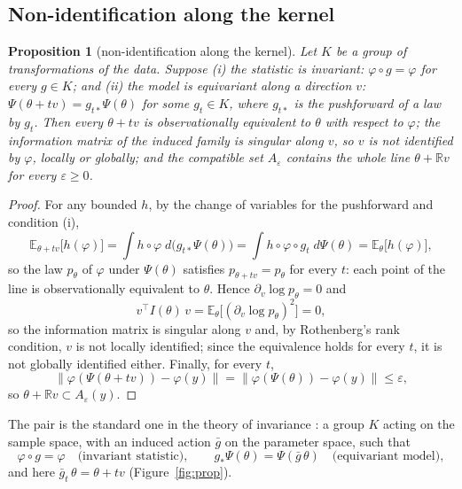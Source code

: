 \documentclass[11pt]{article}
\newtheorem{proposition}{Proposition}
\begin{document}
\subsection{Non-identification along the kernel}
\begin{proposition}[non-identification along the kernel]
Let $K$ be a group of transformations of the data. Suppose (i) the statistic is \emph{invariant}: $\varphi\circ g=\varphi$ for every $g\in K$; and (ii) the model is \emph{equivariant along a direction $v$}: $\Psi(\theta+tv)=g_{t*}\Psi(\theta)$ for some $g_t\in K$, where $g_{t*}$ is the pushforward of a law by $g_t$. Then every $\theta+tv$ is observationally equivalent to $\theta$ with respect to $\varphi$; the information matrix of the induced family is singular along $v$, so $v$ is not identified by $\varphi$, locally or globally; and the compatible set $A_\varepsilon$ contains the whole line $\theta+\mathbb{R}v$ for every $\varepsilon\ge 0$.
\end{proposition}
\begin{proof}
For any bounded $h$, by the change of variables for the pushforward and condition (i),
\[
\mathbb{E}_{\theta+tv}\bigl[h(\varphi)\bigr]=\int h\circ\varphi\;d\bigl(g_{t*}\Psi(\theta)\bigr)=\int h\circ\varphi\circ g_t\;d\Psi(\theta)=\mathbb{E}_{\theta}\bigl[h(\varphi)\bigr],
\]
so the law $p_\theta$ of $\varphi$ under $\Psi(\theta)$ satisfies $p_{\theta+tv}=p_\theta$ for every $t$: each point of the line is observationally equivalent to $\theta$. Hence $\partial_v\log p_\theta=0$ and
\[
v^{\top}I(\theta)\,v=\mathbb{E}_\theta\bigl[(\partial_v\log p_\theta)^2\bigr]=0,
\]
so the information matrix is singular along $v$ and, by Rothenberg's rank condition, $v$ is not locally identified; since the equivalence holds for every $t$, it is not globally identified either. Finally, for every $t$,
\[
\|\varphi(\Psi(\theta+tv))-\varphi(y)\|=\|\varphi(\Psi(\theta))-\varphi(y)\|\le\varepsilon,
\]
so $\theta+\mathbb{R}v\subset A_\varepsilon(y)$.
\end{proof}
The pair is the standard one in the theory of invariance \parencite[ch.~6]{lehmann2005}: a group $K$ acting on the sample space, with an induced action $\bar g$ on the parameter space, such that
\[
\varphi\circ g=\varphi \quad\text{(invariant statistic)}, \qquad g_{*}\Psi(\theta)=\Psi(\bar g\,\theta) \quad\text{(equivariant model)},
\]
and here $\bar g_t\,\theta=\theta+tv$ (Figure~\ref{fig:prop}).
\end{document}
